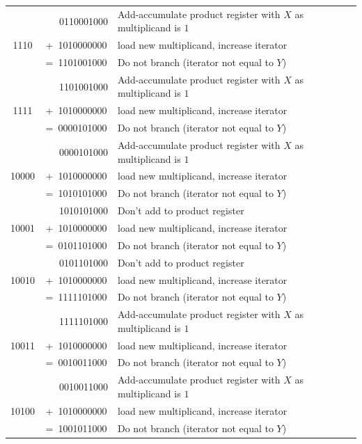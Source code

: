 \documentclass[a4paper]{report}
\begin{document}
\begin{center}
\begin{longtable}{|c|c|l|}
		\hline                  
		         & ~~~0110001000 & Add-accumulate product register with $X$ as multiplicand is $1$ \\
		1110     &  +~1010000000 & load new multiplicand, increase iterator \\
		         &  =~1101001000 & Do not branch (iterator not equal to $Y$) \\
		\hline \hline           
		         & ~~~1101001000 & Add-accumulate product register with $X$ as multiplicand is $1$ \\
		1111     &  +~1010000000 & load new multiplicand, increase iterator \\
		         &  =~0000101000 & Do not branch (iterator not equal to $Y$) \\
		\hline                  
		         & ~~~0000101000 & Add-accumulate product register with $X$ as multiplicand is $1$ \\
		10000    &  +~1010000000 & load new multiplicand, increase iterator \\
		         &  =~1010101000 & Do not branch (iterator not equal to $Y$) \\
		\hline                  
		         & ~~~1010101000 & Don't add to product register \\
		10001    &  +~1010000000 & load new multiplicand, increase iterator \\
		         &  =~0101101000 & Do not branch (iterator not equal to $Y$) \\
		\hline                  
		         & ~~~0101101000 & Don't add to product register \\
		10010    &  +~1010000000 & load new multiplicand, increase iterator \\
		         &  =~1111101000 & Do not branch (iterator not equal to $Y$) \\
		\hline                  
		         & ~~~1111101000 & Add-accumulate product register with $X$ as multiplicand is $1$ \\
		10011    &  +~1010000000 & load new multiplicand, increase iterator \\
		         &  =~0010011000 & Do not branch (iterator not equal to $Y$) \\
		\hline \hline           
		         & ~~~0010011000 & Add-accumulate product register with $X$ as multiplicand is $1$ \\
		10100    &  +~1010000000 & load new multiplicand, increase iterator \\
		         &  =~1001011000 & Do not branch (iterator not equal to $Y$) \\

\end{longtable}
\end{center}
\end{document}

